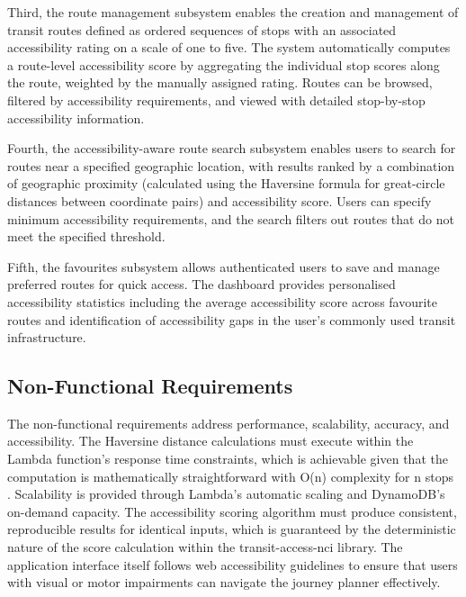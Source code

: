 \documentclass[conference]{IEEEtran}
\begin{document}
Third, the route management subsystem enables the creation and management of transit routes defined as ordered sequences of stops with an associated accessibility rating on a scale of one to five. The system automatically computes a route-level accessibility score by aggregating the individual stop scores along the route, weighted by the manually assigned rating. Routes can be browsed, filtered by accessibility requirements, and viewed with detailed stop-by-stop accessibility information.

Fourth, the accessibility-aware route search subsystem enables users to search for routes near a specified geographic location, with results ranked by a combination of geographic proximity (calculated using the Haversine formula for great-circle distances between coordinate pairs) and accessibility score. Users can specify minimum accessibility requirements, and the search filters out routes that do not meet the specified threshold.

Fifth, the favourites subsystem allows authenticated users to save and manage preferred routes for quick access. The dashboard provides personalised accessibility statistics including the average accessibility score across favourite routes and identification of accessibility gaps in the user's commonly used transit infrastructure.

\subsection{Non-Functional Requirements}

The non-functional requirements address performance, scalability, accuracy, and accessibility. The Haversine distance calculations must execute within the Lambda function's response time constraints, which is achievable given that the computation is mathematically straightforward with O(n) complexity for n stops \cite{awslambda}. Scalability is provided through Lambda's automatic scaling and DynamoDB's on-demand capacity. The accessibility scoring algorithm must produce consistent, reproducible results for identical inputs, which is guaranteed by the deterministic nature of the score calculation within the transit-access-nci library. The application interface itself follows web accessibility guidelines to ensure that users with visual or motor impairments can navigate the journey planner effectively.

\end{document}

